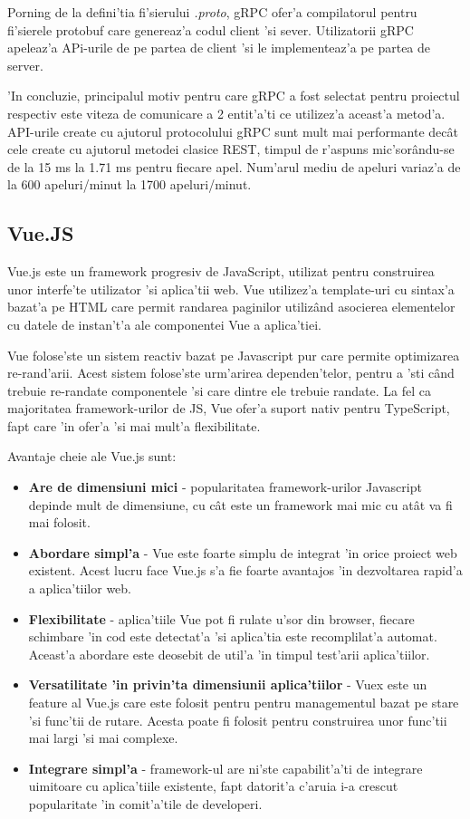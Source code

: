 \documentclass[12pt,a4paper,twoside]{report}
\begin{document}
Porning de la defini'tia fi'sierului \textit{.proto}, gRPC ofer'a compilatorul pentru fi'sierele protobuf care genereaz'a codul client 'si sever. Utilizatorii gRPC apeleaz'a APi-urile de pe partea de client 'si le implementeaz'a pe partea de server.

'In concluzie, principalul motiv pentru care gRPC a fost selectat pentru proiectul respectiv este viteza de comunicare a 2 entit'a'ti ce utilizez'a aceast'a metod'a. API-urile create cu ajutorul protocolului gRPC sunt mult mai performante decât cele create cu ajutorul metodei clasice REST, timpul de r'aspuns mic'sorându-se de la 15 ms la 1.71 ms pentru fiecare apel. Num'arul mediu de apeluri variaz'a de la 600 apeluri/minut la 1700 apeluri/minut.
\subsection{Vue.JS}
Vue.js este un framework progresiv de JavaScript, utilizat pentru construirea unor interfe'te utilizator 'si aplica'tii web. Vue utilizez'a template-uri cu sintax'a bazat'a pe HTML care permit randarea paginilor utilizând asocierea elementelor cu datele de instan't'a ale componentei Vue a aplica'tiei.

Vue folose'ste un sistem reactiv bazat pe Javascript pur care permite optimizarea re-rand'arii. Acest sistem folose'ste urm'arirea dependen'telor, pentru a 'sti când trebuie re-randate componentele 'si care dintre ele trebuie randate. La fel ca majoritatea framework-urilor de JS, Vue ofer'a suport nativ pentru TypeScript, fapt care 'in ofer'a 'si mai mult'a flexibilitate.

Avantaje cheie ale Vue.js sunt: 
\begin{itemize}
\item{\textbf{Are de dimensiuni mici}  - popularitatea framework-urilor Javascript depinde mult de dimensiune, cu cât este un framework mai mic cu atât va fi mai folosit.}
\item{\textbf{Abordare simpl'a} - Vue este foarte simplu de integrat 'in orice proiect web existent. Acest lucru face Vue.js s'a fie foarte avantajos 'in dezvoltarea rapid'a a aplica'tiilor web.}
\item{\textbf{Flexibilitate} - aplica'tiile Vue pot fi rulate u'sor din browser, fiecare schimbare 'in cod este detectat'a 'si aplica'tia este recomplilat'a automat. Aceast'a abordare este deosebit de util'a 'in timpul test'arii aplica'tiilor. }
\item{\textbf{Versatilitate 'in privin'ta dimensiunii aplica'tiilor} - Vuex este un feature al Vue.js care este folosit pentru pentru managementul bazat pe stare 'si func'tii de rutare. Acesta poate fi folosit pentru construirea unor func'tii mai largi 'si mai complexe. }
\item{\textbf{Integrare simpl'a} - framework-ul are ni'ste capabilit'a'ti de integrare uimitoare cu aplica'tiile existente, fapt datorit'a c'aruia i-a crescut popularitate 'in comit'a'tile de developeri.  }
\end{itemize}
\end{document}
